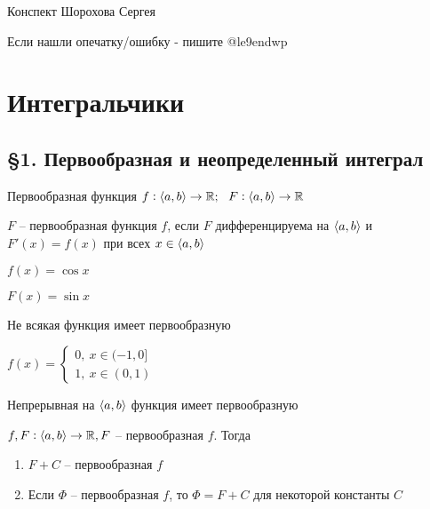 \documentclass[12pt]{article}
\begin{document}
\tableofcontents
\newpage

\begin{flushright}
    Конспект Шорохова Сергея

    Если нашли опечатку/ошибку - пишите @le9endwp
\end{flushright}

\section{Интегральчики}

\subsection{\S 1. Первообразная и неопределенный интеграл}

\begin{defin}{Первообразная функция}
    $f : \langle a, b \rangle \rightarrow \mathbb R;\ \ F: \langle a, b \rangle \rightarrow \mathbb R$ 

    $F$ -- первообразная функция $f$, если $F$ дифференцируема на $\langle a, b \rangle$ и $F'(x) = f(x)$ при всех $x \in \langle a, b \rangle$

    \begin{Example}{}
        $f(x) = \cos{x}$

        $F(x) = \sin{x}$ 
    \end{Example}
\end{defin}

\begin{propos}{}
    Не всякая функция имеет первообразную

    \begin{Example}{}
        $f(x) = \begin{cases}
            0,\ x \in (-1, 0] \\
            1,\ x \in (0, 1)
        \end{cases}$
    \end{Example}
\end{propos}

\begin{propos}{}
    Непрерывная на $\langle a, b \rangle$ функция имеет первообразную
\end{propos}

\begin{theo}{}
    $f, F : \langle a, b \rangle \rightarrow \mathbb R, F$ -- первообразная $f$. Тогда

    \begin{enumerate}
        \item $F + C$ -- первообразная $f$
        \item Если $\Phi$ -- первообразная $f$, то $\Phi = F + C$ для некоторой константы $C$
    \end{enumerate}
\end{theo}
\end{document}
